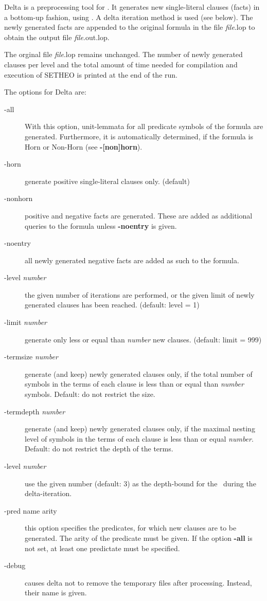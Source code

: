 {\sc Delta}
is a preprocessing tool for \Se. It generates new single-literal
clauses (facts) in a bottom-up fashion, using \Se.
A delta iteration method is used (see below). 
 The newly generated facts are appended to the original formula in the file
{\em file}.lop to obtain the output file {\em file}.out.lop.

The orginal file {\em file}.lop remains unchanged.
The number of newly generated clauses per level and the total
amount of time needed for compilation and execution of SETHEO
is printed at the end of the run.

The options for {\sc Delta} are:

\begin{description}
\item[-all]
With this option, unit-lemmata for all predicate symbols of the
formula are generated. Furthermore, it is automatically determined,
if the formula is Horn or Non-Horn (see {\bf -[non]horn}).

\item[-horn]
generate positive single-literal clauses only. (default)
\item[-nonhorn]
positive and negative facts are generated. These are
added as additional queries to
the formula unless {\bf -noentry} is given.
\item[-noentry]
all newly generated negative facts are added as such
to the formula.
\item[-level {\em number}]
the given number of iterations are performed, or the given limit
of newly generated clauses has been reached. (default: level = 1)
\item[-limit {\em number}]
generate only less or equal than 
{\em number\/}
new clauses. (default: limit = 999)
\item[-termsize {\em number}]
generate (and keep) newly generated clauses only, if the total
number of symbols in the terms of each clause is
less than or equal than {\em number\/} symbols.
Default: do not restrict the size.
\item[-termdepth {\em number}]
generate (and keep) newly generated clauses only, if the maximal
nesting level of symbols in the terms of each clause is less than or equal
{\em number\/}. Default: do not restrict the depth of the terms.
\item[-level {\em number}]
use the given number (default: 3) as the depth-bound for the
\SAM\ during the delta-iteration.
\item[-pred name arity]
this option specifies the predicates, for which
new clauses are to be generated. The arity of the predicate must be given.
If the option {\bf -all} is not set,
at least one predictate must be specified.
\item[-debug] causes
{\sc delta}
not to remove the temporary files after processing. Instead, their name
is given.
\end{description}

